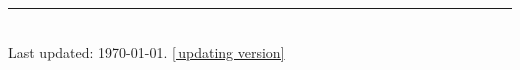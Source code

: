 \documentclass[12pt]{article} %
\begin{document}
% 


%


\centering
\rule{0.25\linewidth}{0.4pt}\\
\medskip
Last updated: \today. \href{https://ynbsztl.github.io/ztlcv/CV_Tianlei.pdf}{[\faFilePdfO\,updating version]}
\end{document}
